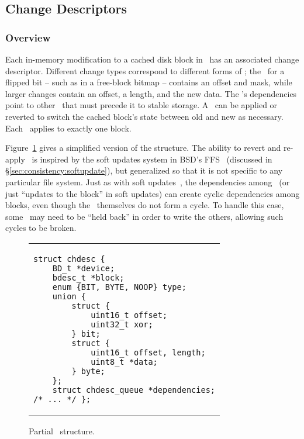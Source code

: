 \subsection {Change Descriptors}
\label{sec:design:chdescs}

\subsubsection {Overview}
Each in-memory modification to a cached disk block in \Kudos\ has an associated
change descriptor. Different change types correspond to different forms of
\chdescs; the \chdesc\ for a flipped bit -- such as in a free-block bitmap --
contains an offset and mask, while larger changes contain an offset, a length,
and the new data. The \chdesc's dependencies point to other \chdescs\ that must
precede it to stable storage. A \chdesc\ can be applied or reverted to switch
the cached block's state between old and new as necessary. Each \chdesc\ applies
to exactly one block.

Figure~\ref{fig:chdesc} gives a simplified version of the structure. The ability
to revert and re-apply \chdescs\ is inspired by the soft updates system in BSD's
FFS~\cite{ganger00soft} (discussed in \S\ref{sec:consistency:softupdate}), but
generalized so that it is not specific to any particular file system. Just as
with soft updates~\cite{ganger00soft}, the dependencies among \chdescs\ (or just
``updates to the block'' in soft updates) can create cyclic dependencies among
blocks, even though the \chdescs\ themselves do not form a cycle. To handle this
case, some \chdescs\ may need to be ``held back'' in order to write the others,
allowing such cycles to be broken.

\begin{figure}
\vskip-14pt
\begin{tabular}{@{\hskip0.58in}p{2in}@{}}
\begin{scriptsize}
\begin{verbatim}
struct chdesc {
    BD_t *device;
    bdesc_t *block;
    enum {BIT, BYTE, NOOP} type;
    union {
        struct {
            uint16_t offset;
            uint32_t xor;
        } bit;
        struct {
            uint16_t offset, length;
            uint8_t *data;
        } byte;
    };
    struct chdesc_queue *dependencies;
/* ... */ };
\end{verbatim}
\end{scriptsize}
\end{tabular}
\vspace{-10pt}
\caption{\label{fig:chdesc} Partial \chdesc\ structure.}
\end{figure}

